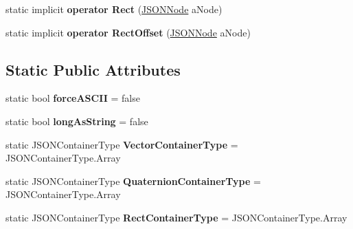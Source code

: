 \begin{DoxyCompactItemize}
\item 
static implicit {\bfseries operator Rect} (\hyperlink{classSimpleJSON_1_1JSONNode}{J\+S\+O\+N\+Node} a\+Node)\hypertarget{classSimpleJSON_1_1JSONNode_a99983de59581b3e3fc352cc66eba8e04}{}\label{classSimpleJSON_1_1JSONNode_a99983de59581b3e3fc352cc66eba8e04}

\item 
static implicit {\bfseries operator Rect\+Offset} (\hyperlink{classSimpleJSON_1_1JSONNode}{J\+S\+O\+N\+Node} a\+Node)\hypertarget{classSimpleJSON_1_1JSONNode_a64f8924cb6c0b0230169ec65a9fa9e58}{}\label{classSimpleJSON_1_1JSONNode_a64f8924cb6c0b0230169ec65a9fa9e58}

\end{DoxyCompactItemize}
\subsection*{Static Public Attributes}
\begin{DoxyCompactItemize}
\item 
static bool {\bfseries force\+A\+S\+C\+II} = false\hypertarget{classSimpleJSON_1_1JSONNode_afdf2a8b0f6ad66ab7ff9d23dfe22d9cd}{}\label{classSimpleJSON_1_1JSONNode_afdf2a8b0f6ad66ab7ff9d23dfe22d9cd}

\item 
static bool {\bfseries long\+As\+String} = false\hypertarget{classSimpleJSON_1_1JSONNode_abc564a3ae24df06181cbb8d2b7cf5b45}{}\label{classSimpleJSON_1_1JSONNode_abc564a3ae24df06181cbb8d2b7cf5b45}

\item 
static J\+S\+O\+N\+Container\+Type {\bfseries Vector\+Container\+Type} = J\+S\+O\+N\+Container\+Type.\+Array\hypertarget{classSimpleJSON_1_1JSONNode_a3d8a98aa5bf7ffdeae7ac24456e789e8}{}\label{classSimpleJSON_1_1JSONNode_a3d8a98aa5bf7ffdeae7ac24456e789e8}

\item 
static J\+S\+O\+N\+Container\+Type {\bfseries Quaternion\+Container\+Type} = J\+S\+O\+N\+Container\+Type.\+Array\hypertarget{classSimpleJSON_1_1JSONNode_a56f455b4bd6b3ee1bf313c7eefe8c13f}{}\label{classSimpleJSON_1_1JSONNode_a56f455b4bd6b3ee1bf313c7eefe8c13f}

\item 
static J\+S\+O\+N\+Container\+Type {\bfseries Rect\+Container\+Type} = J\+S\+O\+N\+Container\+Type.\+Array\hypertarget{classSimpleJSON_1_1JSONNode_a1bfd1254c640246d1d85ce90bdb76a81}{}\label{classSimpleJSON_1_1JSONNode_a1bfd1254c640246d1d85ce90bdb76a81}

\end{DoxyCompactItemize}
